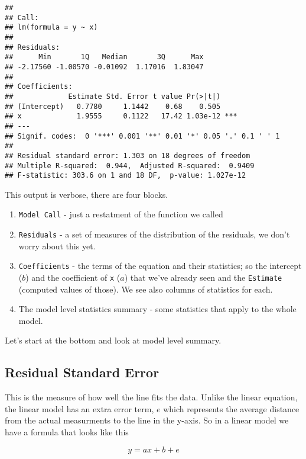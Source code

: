\documentclass[]{book}
\providecommand{\tightlist}{%
  \setlength{\itemsep}{0pt}\setlength{\parskip}{0pt}}
\begin{document}
\begin{verbatim}
## 
## Call:
## lm(formula = y ~ x)
## 
## Residuals:
##      Min       1Q   Median       3Q      Max 
## -2.17560 -1.00570 -0.01092  1.17016  1.83047 
## 
## Coefficients:
##             Estimate Std. Error t value Pr(>|t|)    
## (Intercept)   0.7780     1.1442    0.68    0.505    
## x             1.9555     0.1122   17.42 1.03e-12 ***
## ---
## Signif. codes:  0 '***' 0.001 '**' 0.01 '*' 0.05 '.' 0.1 ' ' 1
## 
## Residual standard error: 1.303 on 18 degrees of freedom
## Multiple R-squared:  0.944,  Adjusted R-squared:  0.9409 
## F-statistic: 303.6 on 1 and 18 DF,  p-value: 1.027e-12
\end{verbatim}

This output is verbose, there are four blocks.

\begin{enumerate}
\def\labelenumi{\arabic{enumi}.}
\tightlist
\item
  \texttt{Model\ Call} - just a restatment of the function we called
\item
  \texttt{Residuals} - a set of measures of the distribution of the residuals, we don't worry about this yet.
\item
  \texttt{Coefficients} - the terms of the equation and their statistics; so the intercept (\(b\)) and the coefficient of \texttt{x} (\(a\)) that we've already seen and the \texttt{Estimate} (computed values of those). We see also columns of statistics for each.
\item
  The model level statistics summary - some statistics that apply to the whole model.
\end{enumerate}

Let's start at the bottom and look at model level summary.

\hypertarget{residual-standard-error}{%
\subsection{Residual Standard Error}\label{residual-standard-error}}

This is the measure of how well the line fits the data. Unlike the linear equation, the linear model has an extra error term, \(e\) which represents the average distance from the actual measurments to the line in the y-axis. So in a linear model we have a formula that looks like this

\begin{equation}
 y = ax + b + e
\end{equation}
\end{document}

